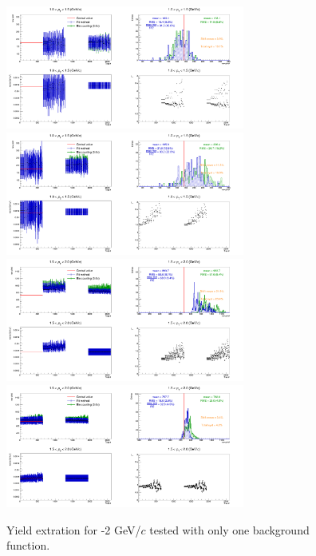 \begin{figure}[!h]
\begin{center}
\includegraphics[width=0.7\textwidth]{figures/Dstar/pp13TeV/multi_trial/multi_bin_bkg4alt_1-1dot5GeV.png}
\includegraphics[width=0.7\textwidth]{figures/Dstar/pp13TeV/multi_trial/multi_bin_bkg4std_1-1dot5GeV.png}
\includegraphics[width=0.7\textwidth]{figures/Dstar/pp13TeV/multi_trial/multi_bin_bkg5alt_1dot5-2GeV.png}
\includegraphics[width=0.7\textwidth]{figures/Dstar/pp13TeV/multi_trial/multi_bin_bkg5std_1dot5-2GeV.png}
\caption{Yield extration for -2 GeV/$c$ tested with only one background function.}
\end{center}
\end{figure}



